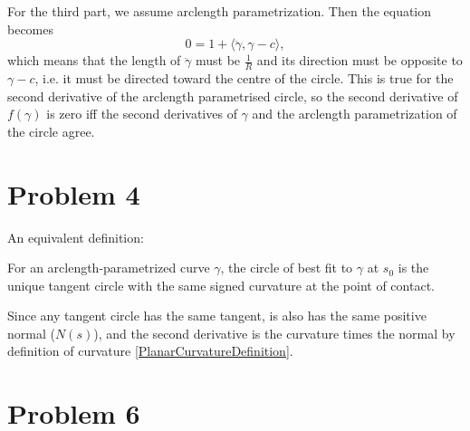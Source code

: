 For the third part, we assume arclength parametrization. Then the equation becomes
\[
0 = 1 + \langle \ddot\gamma, \gamma - c \rangle,
\]
which means that the length of \( \ddot\gamma \) must be \( \frac1R\) and its direction must be opposite to \(\gamma - c \), i.e. it must be directed toward the centre of the circle. This is true for the second derivative of the arclength parametrised circle, so the second derivative of \( f( \gamma ) \) is zero iff the second derivatives of \(\gamma\) and the arclength parametrization of the circle agree.

\section*{Problem 4} An equivalent definition:

\begin{defn}
    For an arclength-parametrized curve \(\gamma\), the circle of best fit to \(\gamma\) at \( s_0 \) is the unique tangent circle with the same signed curvature at the point of contact.
\end{defn}

Since any tangent circle has the same tangent, is also has the same positive normal (\(N(s)\)), and the second derivative is the curvature times the normal by definition of curvature \ref{PlanarCurvatureDefinition}.

\section*{Problem 6}

